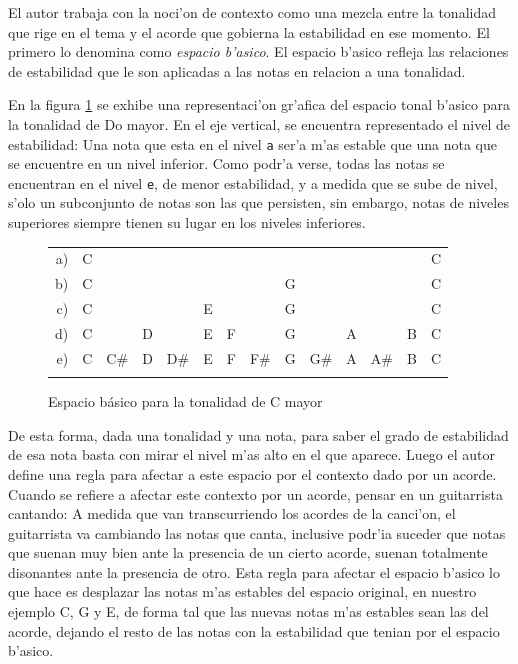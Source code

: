 El autor trabaja con la noci'on de contexto como una mezcla entre la tonalidad que rige en el tema  y el
acorde que gobierna la estabilidad en ese momento. El primero lo denomina como \emph{espacio b'asico}. 
El espacio b'asico refleja las relaciones de estabilidad que le son aplicadas a las notas en relacion a una tonalidad. 

En la figura \ref{fig:basic_space} se exhibe una representaci'on gr'afica del espacio tonal b'asico para la tonalidad de Do mayor. En el eje vertical, se encuentra
representado el nivel de estabilidad: Una nota que esta en el nivel \texttt{a} ser'a m'as estable que una nota que se encuentre en un nivel inferior. Como 
podr'a verse, todas las notas se encuentran en el nivel \texttt{e}, de menor estabilidad, y a medida que se sube de nivel, s'olo un subconjunto de notas son las 
que persisten, sin embargo, notas de niveles superiores siempre tienen su lugar en los niveles inferiores.

\begin{figure}
\begin{center}
\begin{tabular}{r c c c c c c c c c c c c c} 
a) & C &     &   &     &   &   &     &   &     &   &     &   & C\\
b) & C &     &   &     &   &   &     & G &     &   &     &   & C\\
c) & C &     &   &     & E &   &     & G &     &   &     &   & C\\
d) & C &     & D &     & E & F &     & G &     & A &     & B & C\\
e) & C & C\# & D & D\# & E & F & F\# & G & G\# & A & A\# & B & C\\
\newline
\end{tabular}
\caption{ Espacio b\'asico para la tonalidad de C mayor}
\label{fig:basic_space}
\end{center}
\end{figure}


De esta forma, dada una tonalidad y una nota, para saber el grado de estabilidad de esa nota basta con mirar el nivel m'as alto en el que aparece.
Luego el autor define una regla para afectar a este espacio por el contexto dado por un acorde. Cuando se refiere a afectar este contexto por un acorde, pensar
en un guitarrista cantando: A medida que van transcurriendo los acordes de la canci'on, el guitarrista va cambiando las notas que canta, inclusive podr'ia
suceder que notas que suenan muy bien ante la presencia de un cierto acorde, suenan totalmente disonantes ante la presencia de otro. 
Esta regla para afectar el espacio b'asico lo que hace es desplazar las notas m'as estables del espacio original, en nuestro ejemplo C, G y E, de forma tal
que las nuevas notas m'as estables sean las del acorde, dejando el resto de las notas con la estabilidad que tenian por el espacio b'asico. 


